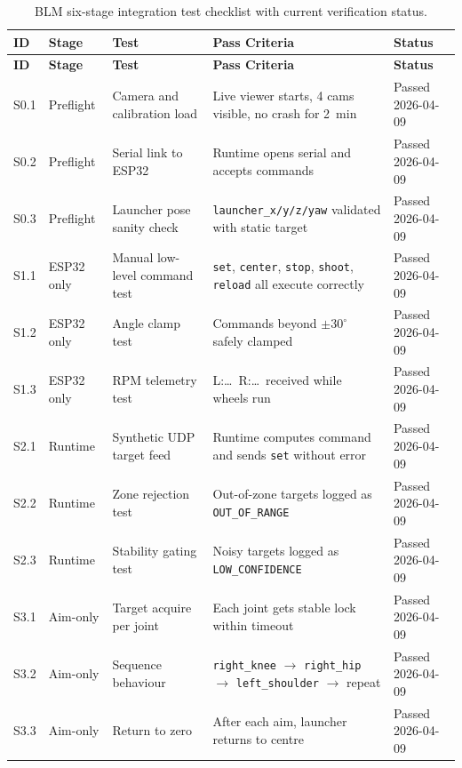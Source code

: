 {\footnotesize
\begin{longtable}{|l|l|p{3.5cm}|p{5cm}|p{2cm}|}
\caption{BLM six-stage integration test checklist with current verification status.} \label{tab:app_a_checklist} \\
\hline
\textbf{ID} & \textbf{Stage} & \textbf{Test} & \textbf{Pass Criteria} & \textbf{Status} \\
\hline
\endfirsthead
\hline
\textbf{ID} & \textbf{Stage} & \textbf{Test} & \textbf{Pass Criteria} & \textbf{Status} \\
\hline
\endhead
\hline
\endfoot
S0.1 & Preflight & Camera and calibration load & Live viewer starts, 4 cams visible, no crash for 2~min & Passed 2026-04-09 \\
\hline
S0.2 & Preflight & Serial link to ESP32 & Runtime opens serial and accepts commands & Passed 2026-04-09 \\
\hline
S0.3 & Preflight & Launcher pose sanity check & \texttt{launcher\_x/y/z/yaw} validated with static target & Passed 2026-04-09 \\
\hline
S1.1 & ESP32 only & Manual low-level command test & \texttt{set}, \texttt{center}, \texttt{stop}, \texttt{shoot}, \texttt{reload} all execute correctly & Passed 2026-04-09 \\
\hline
S1.2 & ESP32 only & Angle clamp test & Commands beyond $\pm 30^\circ$ safely clamped & Passed 2026-04-09 \\
\hline
S1.3 & ESP32 only & RPM telemetry test & L:\ldots\ R:\ldots\ received while wheels run & Passed 2026-04-09 \\
\hline
S2.1 & Runtime & Synthetic UDP target feed & Runtime computes command and sends \texttt{set} without error & Passed 2026-04-09 \\
\hline
S2.2 & Runtime & Zone rejection test & Out-of-zone targets logged as \texttt{OUT\_OF\_RANGE} & Passed 2026-04-09 \\
\hline
S2.3 & Runtime & Stability gating test & Noisy targets logged as \texttt{LOW\_CONFIDENCE} & Passed 2026-04-09 \\
\hline
S3.1 & Aim-only & Target acquire per joint & Each joint gets stable lock within timeout & Passed 2026-04-09 \\
\hline
S3.2 & Aim-only & Sequence behaviour & \texttt{right\_knee} $\to$ \texttt{right\_hip} $\to$ \texttt{left\_shoulder} $\to$ repeat & Passed 2026-04-09 \\
\hline
S3.3 & Aim-only & Return to zero & After each aim, launcher returns to centre & Passed 2026-04-09 \\

\end{longtable}}
